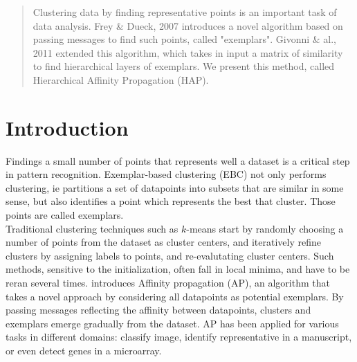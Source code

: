 \documentclass{ipol}
\begin{document}
\begin{abstract}

Clustering data by finding representative points is an important task of data
analysis. Frey \& Dueck, 2007 \cite{frey07affinitypropagation} introduces a
novel algorithm based on passing messages to find such points, called
"exemplars". Givonni \& al., 2011 \cite{hap} extended this algorithm, which
takes in input a matrix of similarity to find hierarchical layers of
exemplars. We present this method, called Hierarchical Affinity Propagation
(HAP).

\end{abstract}

\begin{ipolCode}
\end{ipolCode}

\begin{ipolSupp}
\end{ipolSupp}

\section{Introduction}

Findings a small number of points that represents well a dataset is a critical
step in pattern recognition. Exemplar-based clustering (EBC) not only performs
clustering, ie partitions a set of datapoints into subsets that are similar in
some sense, but also identifies a point which represents the best that
cluster. Those points are called exemplars.\\

Traditional clustering techniques such as $k$-means start by randomly choosing a
number of points from the dataset as cluster centers, and iteratively refine
clusters by assigning labels to points, and re-evalutating cluster centers.
Such methods, sensitive to the initialization, often fall in local minima, and
have to be reran several times. \cite{frey07affinitypropagation} introduces
Affinity propagation (AP), an algorithm that takes a novel approach by
considering all datapoints as potential exemplars. By passing messages
reflecting the affinity between datapoints, clusters and exemplars emerge
gradually from the dataset. AP has been applied for various tasks in different
domains: classify image, identify representative in a manuscript, or even
detect genes in a microarray.\\
\end{document}
